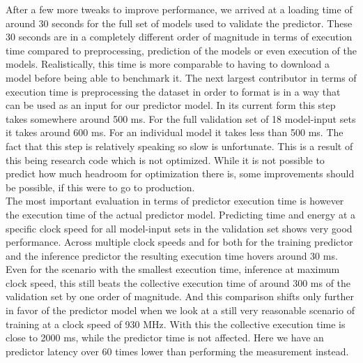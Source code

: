 After a few more tweaks to improve performance, we arrived at a loading time of around 30 seconds for the full set of models used to validate the predictor. These 30 seconds are in a completely different order of magnitude in terms of execution time compared to preprocessing, prediction of the models or even execution of the models. Realistically, this time is more comparable to having to download a model before being able to benchmark it. The next largest contributor in terms of execution time is preprocessing the dataset in order to format is in a way that can be used as an input for our predictor model. In its current form this step takes somewhere around 500 ms. For the full validation set of 18 model-input sets it takes around 600 ms. For an individual model it takes less than 500 ms. The fact that this step is relatively speaking so slow is unfortunate. This is a result of this being research code which is not optimized. While it is not possible to predict how much headroom for optimization there is, some improvements should be possible, if this were to go to production. \\
The most important evaluation in terms of predictor execution time is however the execution time of the actual predictor model. Predicting time and energy at a specific clock speed for all model-input sets in the validation set shows very good performance. Across multiple clock speeds and for both for the training predictor and the inference predictor the resulting execution time hovers around 30 ms. Even for the scenario with the smallest execution time, inference at maximum clock speed, this still beats the collective execution time of around 300 ms of the validation set by one order of magnitude. And this comparison shifts only further in favor of the predictor model when we look at a still very reasonable scenario of training at a clock speed of 930 MHz. With this the collective execution time is close to 2000 ms, while the predictor time is not affected. Here we have an predictor latency over 60 times lower than performing the measurement instead.